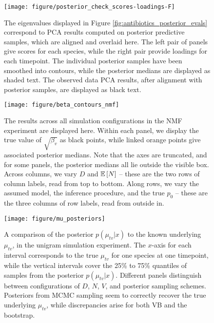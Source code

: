 \documentclass[oupdraft]{bio}
\begin{document}
\begin{figure}[!p]
  \centering
  \texttt{[image: figure/posterior\_check\_scores-loadings-F]}
  \caption{The eigenvalues displayed in Figure
    \ref{fig:antibiotics_posterior_evals} correspond to PCA results computed on
    posterior predictive samples, which are aligned and overlaid here. The left
    pair of panels give scores for each species, while the right pair provide
    loadings for each timepoint. The individual posterior samples have been
    smoothed into contours, while the posterior medians are displayed as shaded
    text. The observed data PCA results, after alignment with posterior samples,
    are displayed as black text. \label{fig:antibiotics_posterior_pca} }
\end{figure}

\begin{figure}[!p]
  \centering
  \texttt{[image: figure/beta\_contours\_nmf]}
  \caption{The results across all simulation configurations in the NMF
    experiment are displayed here. Within each panel, we display the true value
    of $\sqrt{\beta_{v}}$ as black points, while linked orange points give
    associated posterior medians. Note that the axes are truncated, and for some
    panels, the posterior medians all lie outside the visible box. Across
    columns, we vary $D$ and $\mathbb{E}\left[{N}\right]$ -- these are the two rows of column
    labels, read from top to bottom. Along rows, we vary the assumed model, the
    inference procedure, and the true $p_{0}$ -- these are the three columns of
    row labels, read from outside in.\label{fig:beta_contours_nmf}}
\end{figure}

\begin{figure}[ht]
  \centering
  \texttt{[image: figure/mu\_posteriors]}
  \caption{
    A comparison of the posterior $p\left(\mu_{tv} \vert x\right)$ to the known
    underlying $\mu_{tv}$, in the unigram simulation experiment. The $x$-axis
    for each interval corresponds to the true $\mu_{tv}$ for one species at one
    timepoint, while the vertical intervals cover the 25\% to 75\% quantiles of
    samples from the posterior $p\left(\mu_{tv} \vert x\right)$. Different
    panels distinguish between configurations of $D$, $N$, $V$, and posterior
    sampling schemes. Posteriors from MCMC sampling seem to correctly recover
    the true underlying $\mu_{tv}$, while discrepancies arise for both VB and
    the bootstrap.
    \label{fig:mu_posteriors} }
\end{figure}
\end{document}
